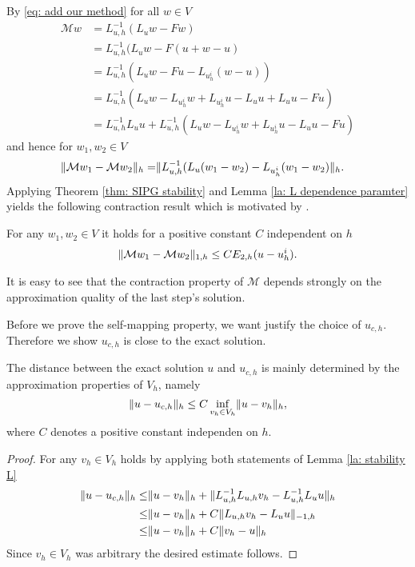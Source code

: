 By \eqref{eq: add our method} for all $w \in V$
\begin{align}
	\mathcal M w &= L_{u,h}^{-1}(L_u w - Fw) \nonumber\\
				 &= L_{u,h}^{-1}(L_u w - F(u+w-u) \nonumber\\
				 &= L_{u,h}^{-1}(L_u w - Fu - L_{u^i_h} (w-u)) \nonumber\\
				 &=  L_{u,h}^{-1}(L_u w - L_{u^i_h} w + L_{u^i_h}u - L_u u + L_u u - Fu) \nonumber\\
				 & = L_{u,h}^{-1} L_u u + L_{u,h}^{-1}(L_u w - L_{u^i_h} w + L_{u^i_h}u - L_u u - Fu) \label{eq: expand M}
 \end{align}
and hence for $w_1, w_2 \in V$
\begin{align*}
	\lVert \mathcal M w_1 - \mathcal M w_2 \rVert_{h} =& \lVert L_{u,h}^{-1}(L_u (w_1-w_2) - L_{u^i_h} (w_1-w_2) \rVert_{h}.
\end{align*}
Applying Theorem \ref{thm: SIPG stability} and Lemma \ref{la: L dependence paramter} yields the following contraction result which is motivated by \cite[Lemma 3.4]{BGN+2011}.
\begin{lemma} \label{la: contraction property M}
	For any $w_1, w_2 \in V$ it holds for a positive constant $C$ independent on $h$
\begin{align*}
	\lVert \mathcal M w_1 - \mathcal M w_2 \rVert_{1,h}	\leq C E_{2,h}(u - u^i_h). \label{eq: estimate M}
\end{align*}
\end{lemma}
It is easy to see that the contraction property of $\mathcal{M}$ depends strongly on the approximation quality of the last step's solution. %

Before we prove the self-mapping property, we want justify the choice of $u_{c,h}$. Therefore we show $u_{c,h}$ is close to the exact \MA solution.

\begin{lemma}\label{la: difference u uch}
	The distance between the exact solution $u$ and $u_{c,h}$ is mainly determined by the approximation properties of $V_h$, namely
	\[
		\lVert u-u_{c,h} \rVert_{h} \leq C \inf_{v_h \in V_h} \lVert u-v_h \rVert_{h},
	\]
	where $C$ denotes a positive constant independen on $h$.
\end{lemma}
\begin{proof}
	For any $v_h \in V_h$ holds by applying both statements of Lemma \ref{la: stability L}
	\begin{align}
		\lVert u-u_{c,h} \rVert_{h} \leq& \lVert u- v_h \rVert_{h} + \lVert L_{u,h}^{-1}L_{u,h} v_h- L_{u,h}^{-1}L_u u \rVert_{h} \nonumber \\
						  \leq& \lVert u- v_h \rVert_{h} + C \lVert L_{u,h} v_h-  L_u u \rVert_{-1,h} \nonumber \\
						  \leq& \lVert u- v_h \rVert_{h} + C \lVert v_h -u \rVert_{h} \nonumber
	\end{align}
	Since $v_h \in V_h$ was arbitrary the desired estimate follows.
\end{proof}

